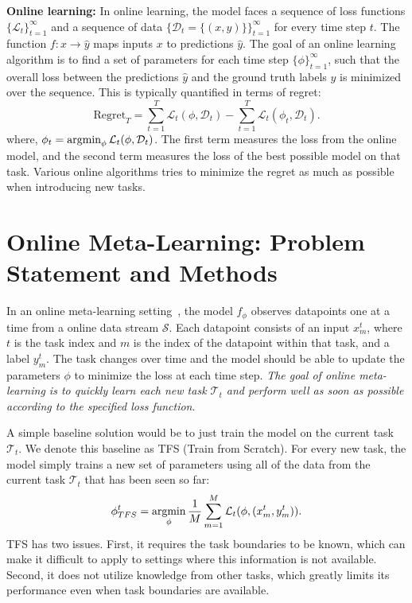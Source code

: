 \noindent \textbf{Online learning:} In online learning, the model faces a sequence of loss functions $\{\mathcal{L}_t\}_{t=1}^\infty$ and a sequence of data $\{\mathcal{D}_t=\{(x,y)\}\}_{t=1}^\infty$ for every time step $t$. The function $f: x \rightarrow \hat{y}$ maps inputs $x$ to predictions $\hat{y}$. The goal of an online learning algorithm is to find a set of parameters for each time step $\{\phi\}_{t=1}^\infty$, such that the overall loss between the predictions $\hat{y}$ and the ground truth labels $y$ is minimized over the sequence. This is typically quantified in terms of regret:
\begin{equation}
    \text{Regret}_T = \sum_{t=1}^T \mathcal{L}_t(\phi, \mathcal{D}_t) - \sum_{t=1}^T \mathcal{L}_{t}(\phi_t, \mathcal{D}_t). 
\end{equation}
where, $\phi_t = \operatorname*{argmin}_{\phi} \mathcal{L}_t(\phi, \mathcal{D}_t)$. The first term measures the loss from the online model, and the second term measures the loss of the best possible model on that task. Various online algorithms tries to minimize the regret as much as possible when introducing new tasks.










\section{Online Meta-Learning: Problem Statement and Methods}

In an online meta-learning setting~\citep{finn19a}, the model $f_{\phi}$ observes datapoints one at a time from a online data stream $\mathcal{S}$. Each datapoint consists of an input $x^t_m$, where $t$ is the task index and $m$ is the index of the datapoint within that task, and a label $y^t_m$. The task changes over time and the model should be able to update the parameters $\phi$ to minimize the loss at each time step. \emph{The goal of online meta-learning is to quickly learn each new task $\mathcal{T}_t$ and perform well as soon as possible according to the specified loss function}.

A simple baseline solution would be to just train the model on the current task $\mathcal{T}_t$. We denote this baseline as TFS (Train from Scratch). For every new task, the model simply trains a new set of parameters using all of the data from the current task $\mathcal{T}_t$ that has been seen so far:
\begin{align*}
    \phi^t_{TFS} = \operatorname*{argmin}_{\phi} \frac{1}{M}\sum_{m=1}^M \mathcal{L}_{t}(\phi, (x^t_m, y^t_m)).
\end{align*}
TFS has two issues. First, it requires the task boundaries to be known, which can make it difficult to apply to settings where this information is not available. Second, it does not utilize knowledge from other tasks, which greatly limits its performance even when task boundaries are available.

